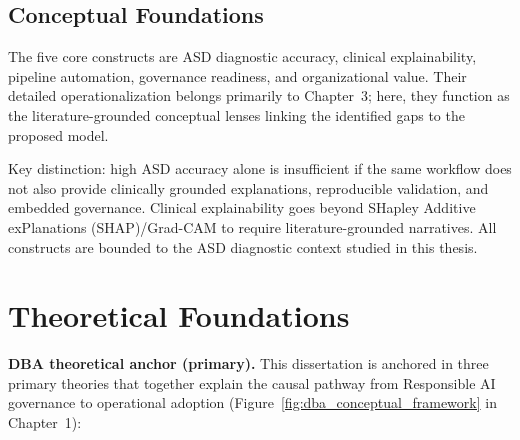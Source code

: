 \subsection{Conceptual Foundations}

The five core constructs are ASD diagnostic accuracy, clinical explainability, pipeline automation, governance readiness, and organizational value. Their detailed operationalization belongs primarily to Chapter~3; here, they function as the literature-grounded conceptual lenses linking the identified gaps to the proposed model.


Key distinction: high ASD accuracy alone is insufficient if the same workflow does not also provide clinically grounded explanations, reproducible validation, and embedded governance. Clinical explainability goes beyond SHapley Additive exPlanations (SHAP)/Grad-CAM to require literature-grounded narratives. All constructs are bounded to the ASD diagnostic context studied in this thesis.


\section{Theoretical Foundations}

\noindent\textbf{DBA theoretical anchor (primary).} This dissertation is anchored in three primary theories that together explain the causal pathway from Responsible AI governance to operational adoption (Figure~\ref{fig:dba_conceptual_framework} in Chapter~1):

